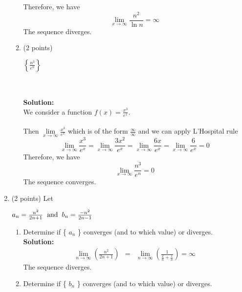 \documentclass[paper=a4, fontsize=11pt]{scrartcl} %
\numberwithin{equation}{section} %
\numberwithin{figure}{section} %
\numberwithin{table}{section} %
\begin{document}
\begin{enumerate}
\begin{enumerate}
Therefore, we have $$\lim\limits_{x\rightarrow\infty}\frac{n^2}{\ln n}=\infty$$
The sequence diverges.
\item (2 points)\hspace{4mm} \begin{large}$\left\{\frac{n^3}{e^n}\right\}$\end{large}\\\\
\textbf{Solution:}\\
\text{   } We consider a function $f(x)=\frac{x^3}{e^x}$.\\\\ Then\hspace{3mm} $\lim\limits_{x\rightarrow\infty}\frac{x^3}{e^ x}$\hspace{3mm} which is of the form\hspace{3mm} $\frac{\infty}{\infty}$ \hspace{3mm} and we can apply L'Hospital rule
$$\lim\limits_{x\rightarrow\infty}\frac{x^3}{e^ x}=\lim\limits_{x\rightarrow\infty}\frac{3x^2}{e^x}=\lim\limits_{x\rightarrow\infty}\frac{6x}{e^x}=\lim\limits_{x\rightarrow\infty}\frac{6}{e^x}=0$$
Therefore, we have $$\lim\limits_{x\rightarrow\infty}\frac{n^3}{e^ n}=0$$
The sequence converges.
\end{enumerate}

\newpage
\item (2 points) Let \begin{large}$a_n=\frac{n^2}{2n+1}\hspace{2mm}\text{and}\hspace{2mm}b_n=\frac{-n^2}{2n-1}$\end{large}
\begin{enumerate}
\item Determine if \{ $a_n$ \} converges (and to which value) or diverges.\\
\noindent\textbf{Solution:}\\
\begin{eqnarray*}
\lim\limits_{n \rightarrow \infty} \left(\frac{n^2}{2n+1}\right) &=& \lim\limits_{n \rightarrow \infty} \left(\frac{1}{\frac{2}{n}+\frac{1}{n}}\right)=\infty
\end{eqnarray*}
The sequence diverges.
\vspace{.5in}
\item Determine if \{ $b_n$ \} converges (and to which value) or diverges.


\end{enumerate}
\end{enumerate}
\end{document}
